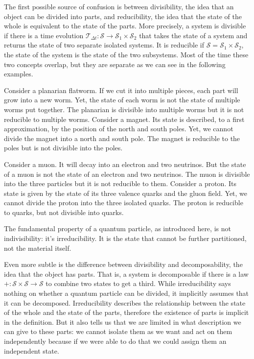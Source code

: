 \documentclass[aps,pra,10pt,twocolumn,floatfix,nofootinbib]{revtex4-1}
\numberwithin{equation}{section}
\theoremstyle{definition}
\begin{document}
The first possible source of confusion is between divisibility, the idea that an object can be divided into parts, and reducibility, the idea that the state of the whole is equivalent to the state of the parts. More precisely, a system is divisible if there is a time evolution $\mathcal{T}_{\Delta t}: \mathcal{S} \rightarrow \mathcal{S}_1 \times \mathcal{S}_2$ that takes the state of a system and returns the state of two separate isolated systems. It is reducible if $\mathcal{S} = \mathcal{S}_1 \times \mathcal{S}_2$, the state of the system is the state of the two subsystems. Most of the time these two concepts overlap, but they are separate as we can see in the following examples.

Consider a planarian flatworm. If we cut it into multiple pieces, each part will grow into a new worm. Yet, the state of each worm is not the state of multiple worms put together. The planarian is divisible into multiple worms but it is not reducible to multiple worms. Consider a magnet. Its state is described, to a first approximation, by the position of the north and south poles. Yet, we cannot divide the magnet into a north and south pole. The magnet is reducible to the poles but is not divisible into the poles.

Consider a muon. It will decay into an electron and two neutrinos. But the state of a muon is not the state of an electron and two neutrinos. The muon is divisible into the three particles but it is not reducible to them. Consider a proton. Its state is given by the state of its three valence quarks and the gluon field. Yet, we cannot divide the proton into the three isolated quarks. The proton is reducible to quarks, but not divisible into quarks.

The fundamental property of a quantum particle, as introduced here, is not indivisibility: it's irreducibility. It is the state that cannot be further partitioned, not the material itself.

Even more subtle is the difference between divisibility and decomposability, the idea that the object has parts. That is, a system is decomposable if there is a law $+ : \mathcal{S} \times \mathcal{S} \rightarrow \mathcal{S}$ to combine two states to get a third. While irreducibility says nothing on whether a quantum particle can be divided, it implicitly assumes that it can be decomposed. Irreducibility describes the relationship between the state of the whole and the state of the parts, therefore the existence of parts is implicit in the definition. But it also tells us that we are limited in what description we can give to these parts: we cannot isolate them as we want and act on them independently because if we were able to do that we could assign them an independent state.
\end{document}
